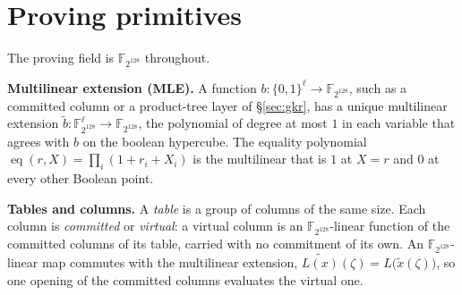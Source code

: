 \documentclass[11pt]{article}
\newcommand{\F}{\mathbb{F}}
\newcommand{\eq}{\operatorname{eq}}
\newcommand{\cube}[1]{\{0,1\}^{#1}}
\newcommand{\loc}[1]{\mem[\fp\cdot #1]}
\newcommand{\fp}{\mathbf{fp}}
\newcommand{\mem}{\mathbf{m}}
\newcommand{\todo}[1]{\textcolor{red}{\textbf{[TODO:} #1\textbf{]}}}
\begin{document}
%

\section{Proving primitives}\label{sec:prelim}

The proving field is $\F_{2^{128}}$ throughout.

\textbf{Multilinear extension (MLE).} A function $b:\cube{\ell}\to\F_{2^{128}}$, such as a committed column or a product-tree layer of \S\ref{sec:gkr}, has a unique multilinear extension $\widetilde b:\F_{2^{128}}^{\ell}\to\F_{2^{128}}$, the polynomial of degree at most $1$ in each variable that agrees with $b$ on the boolean hypercube. The equality polynomial $\eq(r,X)=\prod_i(1+r_i+X_i)$ is the multilinear that is $1$ at $X=r$ and $0$ at every other Boolean point.

\textbf{Tables and columns.} A \emph{table} is a group of columns of the same size. Each column is \emph{committed} or \emph{virtual}: a virtual column is an $\F_{2^{128}}$-linear function of the committed columns of its table, carried with no commitment of its own. An $\F_{2^{128}}$-linear map commutes with the multilinear extension, $\widetilde{L(x)}(\zeta)=L\bigl(\widetilde x(\zeta)\bigr)$, so one opening of the committed columns evaluates the virtual one.
\end{document}

